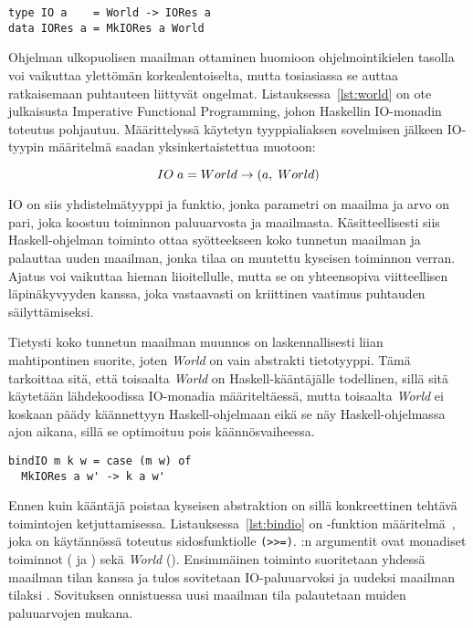 \documentclass[finnish]{tktltiki2}
\begin{document}
\begin{lstlisting}[float,label={lst:world},caption={IFP, IO-tyyppi}]
type IO a    = World -> IORes a
data IORes a = MkIORes a World
\end{lstlisting}

Ohjelman ulkopuolisen maailman ottaminen huomioon ohjelmointikielen tasolla voi vaikuttaa ylettömän
korkealentoiselta, mutta tosiasiassa se auttaa ratkaisemaan puhtauteen liittyvät ongelmat.
Listauksessa~\ref{lst:world} on ote julkaisusta Imperative Functional Programming\cite{ifp93}, johon
Haskellin IO-monadin toteutus pohjautuu. Määrittelyssä käytetyn tyyppialiaksen sovelmisen jälkeen
IO-tyypin määritelmä saadan yksinkertaistettua muotoon:

$$ IO\; a = World \rightarrow (a,\; World) $$

IO on siis yhdistelmätyyppi ja funktio, jonka parametri on maailma ja arvo on pari, joka koostuu
toiminnon paluuarvosta ja maailmasta. Käsitteellisesti siis Haskell-ohjelman toiminto ottaa
syötteekseen koko tunnetun maailman ja palauttaa uuden maailman, jonka tilaa on muutettu kyseisen
toiminnon verran. Ajatus voi vaikuttaa hieman liioitellulle, mutta se on yhteensopiva viitteellisen
läpinäkyvyyden kanssa, joka vastaavasti on kriittinen vaatimus puhtauden säilyttämiseksi.

Tietysti koko tunnetun maailman muunnos on laskennallisesti liian mahtipontinen suorite, joten
\emph{World} on vain abstrakti tietotyyppi. Tämä tarkoittaa sitä, että toisaalta \emph{World} on
Haskell-kääntäjälle todellinen, sillä sitä käytetään lähdekoodissa IO-monadia määriteltäessä, mutta
toisaalta \emph{World} ei koskaan päädy käännettyyn Haskell-ohjelmaan eikä se näy Haskell-ohjelmassa
ajon aikana, sillä se optimoituu pois käännösvaiheessa.

\begin{lstlisting}[float,label={lst:bindio},caption={IFP, bindIO:n määritelmä}]
bindIO m k w = case (m w) of
  MkIORes a w' -> k a w'
\end{lstlisting}

Ennen kuin kääntäjä poistaa kyseisen abstraktion on sillä konkreettinen tehtävä toimintojen
ketjuttamisessa. Listauksessa~\ref{lst:bindio} on -funktion määritelmä~\cite{ifp93},
joka on käytännössä toteutus sidosfunktiolle \verb|(>>=)|. :n argumentit ovat monadiset
toiminnot ( ja ) sekä \emph{World} (). Ensimmäinen toiminto suoritetaan
yhdessä maailman tilan kanssa ja tulos sovitetaan IO-paluuarvoksi  ja uudeksi maailman
tilaksi . Sovituksen onnistuessa uusi maailman tila palautetaan muiden paluuarvojen mukana.
\end{document}
